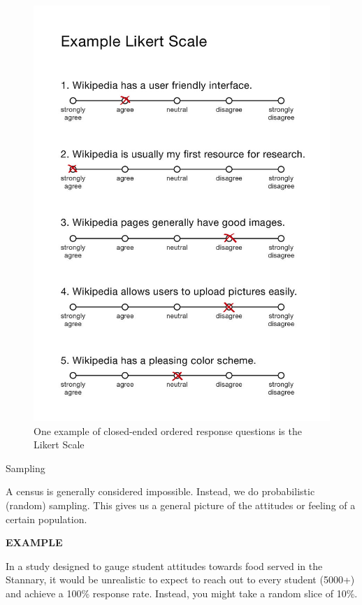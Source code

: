 \begin{frame}{}

\begin{figure}
\centering
\includegraphics{assets/likert.jpg}
\caption{One example of closed-ended ordered response questions is the
Likert Scale}
\end{figure}

\end{frame}

\begin{frame}{Sampling}

A census is generally considered impossible. Instead, we do
probabilistic (random) sampling. This gives us a general picture of the
attitudes or feeling of a certain population.

\textbf{EXAMPLE}

In a study designed to gauge student attitudes towards food served in
the Stannary, it would be unrealistic to expect to reach out to every
student (5000+) and achieve a 100\% response rate. Instead, you might
take a random slice of 10\%.

\end{frame}

